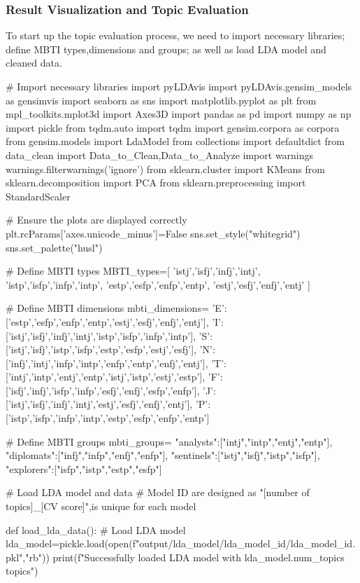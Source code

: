 \documentclass[12pt]{article}
\numberwithin{figure}{section}  %
\begin{document}
	\subsubsection{Result Visualization and Topic Evaluation}
	To start up the topic evaluation process, we need to import necessary
	libraries; define MBTI types,dimensions and groups; as well as load LDA
	model and cleaned data.
		\begin{python}
# Import necessary libraries
import pyLDAvis
import pyLDAvis.gensim_models as gensimvis
import seaborn as sns
import matplotlib.pyplot as plt
from mpl_toolkits.mplot3d import Axes3D
import pandas as pd
import numpy as np
import pickle
from tqdm.auto import tqdm
import gensim.corpora as corpora
from gensim.models import LdaModel
from collections import defaultdict
from data_clean import Data_to_Clean,Data_to_Analyze
import warnings
warnings.filterwarnings('ignore')
from sklearn.cluster import KMeans
from sklearn.decomposition import PCA
from sklearn.preprocessing import StandardScaler

# Ensure the plots are displayed correctly
plt.rcParams['axes.unicode_minus']=False
sns.set_style("whitegrid")
sns.set_palette("husl")

# Define MBTI types
MBTI_types=[
    'istj','isfj','infj','intj',
    'istp','isfp','infp','intp',
    'estp','esfp','enfp','entp',
    'estj','esfj','enfj','entj'
]

# Define MBTI dimensions
mbti_dimensions={
    'E': ['estp','esfp','enfp','entp','estj','esfj','enfj','entj'],
    'I': ['istj','isfj','infj','intj','istp','isfp','infp','intp'],
    'S': ['istj','isfj','istp','isfp','estp','esfp','estj','esfj'],
    'N': ['infj','intj','infp','intp','enfp','entp','enfj','entj'],
    'T': ['intj','intp','entj','entp','istj','istp','estj','estp'],
    'F': ['isfj','infj','isfp','infp','esfj','enfj','esfp','enfp'],
    'J': ['istj','isfj','infj','intj','estj','esfj','enfj','entj'],
    'P': ['istp','isfp','infp','intp','estp','esfp','enfp','entp']
}

# Define MBTI groups
mbti_groups={
    "analysts":["intj","intp","entj","entp"],
    "diplomats":["infj","infp","enfj","enfp"],
    "sentinels":["istj","isfj","istp","isfp"],
    "explorers":["isfp","istp","estp","esfp"]
}

# Load LDA model and data
# Model ID are designed as "[number of topics]_[CV score]",is unique for each model


def load_lda_data():
    # Load LDA model
    lda_model=pickle.load(open(f"output/lda_model/lda_{model_id}/lda_{model_id}.pkl","rb"))
    print(f"Successfully loaded LDA model with {lda_model.num_topics} topics")
    

\end{python}
\end{document}
